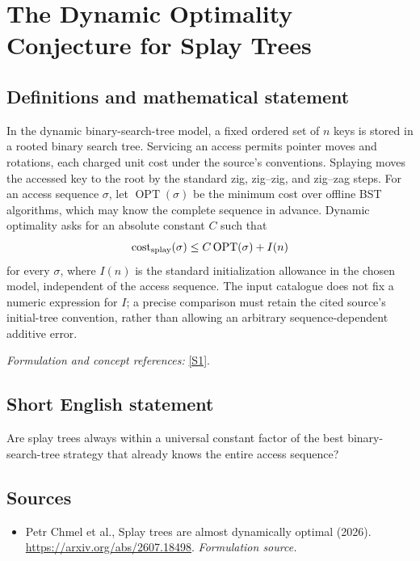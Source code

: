 \documentclass[11pt]{article}
\begin{document}
\section*{\texorpdfstring{The Dynamic Optimality Conjecture for Splay Trees}{The Dynamic Optimality Conjecture for Splay Trees}}\label{306}
\subsection{Definitions and mathematical statement}
In the dynamic binary-search-tree model, a fixed ordered set of $n$ keys is stored in a rooted binary search tree. Servicing an access permits pointer moves and rotations, each charged unit cost under the source's conventions. Splaying moves the accessed key to the root by the standard zig, zig--zig, and zig--zag steps. For an access sequence $\sigma$, let $\operatorname{OPT}(\sigma)$ be the minimum cost over offline BST algorithms, which may know the complete sequence in advance. Dynamic optimality asks for an absolute constant $C$ such that
\[
 \operatorname{cost}_{\rm splay}(\sigma)
 \le C\operatorname{OPT}(\sigma)+I(n)
\]
for every $\sigma$, where $I(n)$ is the standard initialization allowance in the chosen model, independent of the access sequence. The input catalogue does not fix a numeric expression for $I$; a precise comparison must retain the cited source's initial-tree convention, rather than allowing an arbitrary sequence-dependent additive error.
\par\smallskip\textit{Formulation and concept references:} \href{https://arxiv.org/abs/2607.18498}{[S1]}.

\subsection{Short English statement}
Are splay trees always within a universal constant factor of the best binary-search-tree strategy that already knows the entire access sequence?
\subsection{Sources}
\begin{itemize}
\item[S1]Petr Chmel et al., Splay trees are almost dynamically optimal (2026).
\url{https://arxiv.org/abs/2607.18498}.
\textit{Formulation source.}
\end{itemize}
\end{document}
